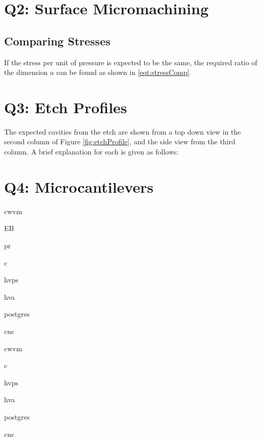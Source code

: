 \documentclass[hidelinks, 12pt]{article}%
\begin{document}
        \section{Q2: Surface Micromachining}
            \subsection{Comparing Stresses}
                If the stress per unit of pressure is expected to be the same, the required 
                ratio of the dimension $a$ can be found as shown in \ref{eqt:stressComp}.

        \section{Q3: Etch Profiles}
            The expected cavities from the etch are shown from a top down view in the second 
            column of Figure \ref{fig:etchProfile}, and the side view from the third column.
            A brief explanation for each is given as follows:

        \section{Q4: Microcantilevers}
            \gls{cwvm}

            \gls{EB}

            \gls{pr}

            \gls{c}

            \gls{hvps}

            \gls{hva}

            \gls{postgres}

            \gls{cnc}

            \clearpage

            \gls{cwvm}

            \gls{c}

            \gls{hvps}

            \gls{hva}

            \gls{postgres}

            \gls{cnc}

        \clearpage
        \printglossary[type=symbols]
        \printglossary[type=\acronymtype]
        \printglossary[type=main]
\end{document}
